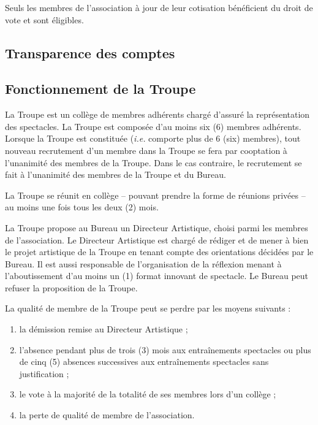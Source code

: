 \documentclass[a4paper,french,10pt]{article}
\begin{document}
Seuls les membres de l’association à jour de leur cotisation
bénéficient du droit de vote et sont éligibles.
\subsection{Transparence des comptes}
\label{sec:transp-des-compt}

\subsection{Fonctionnement de la Troupe}
\label{sec:fonctionnement-troupe}
La Troupe est un collège de membres adhérents chargé d'assuré la représentation des spectacles. La Troupe est composée d'au moins six (6) membres adhérents. Lorsque la Troupe est constituée (\textit{i.e.} comporte plus de 6 (six) membres), tout nouveau recrutement d'un membre dans la Troupe se fera par cooptation à l'unanimité des membres de la Troupe.
Dans le cas contraire, le recrutement se fait à l'unanimité des membres de la Troupe et du Bureau.

 La Troupe se réunit en collège -- pouvant prendre la forme de réunions privées -- au moins une fois tous les deux (2) mois.

La Troupe propose au Bureau un Directeur Artistique, choisi parmi les membres de l'association. Le Directeur Artistique est chargé de rédiger et de mener à bien le projet artistique de la Troupe en tenant compte des orientations décidées par le Bureau. Il est aussi responsable de l'organisation de la réflexion menant à l'aboutissement d'au moins un (1) format innovant de spectacle. Le Bureau peut refuser la proposition de la Troupe. 

La qualité de membre de la Troupe peut se perdre par les moyens suivants :

\begin{enumerate}
	\item la démission remise au Directeur Artistique ;
	\item l'absence pendant plus de trois  (3) mois aux entraînements spectacles ou plus de cinq (5) absences successives aux entraînements spectacles sans justification ;
	\item le vote à la majorité de la totalité de ses membres lors d'un collège ;
	\item la perte de qualité de membre de l'association.

\end{enumerate}
\end{document}
